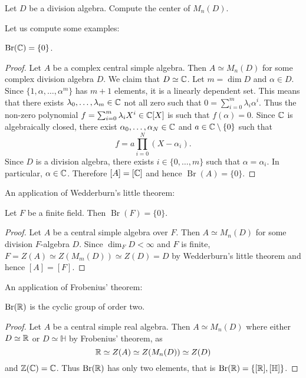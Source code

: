 \begin{exercise}
    Let $D$ be a division algebra. Compute the center of $M_n(D)$. 
\end{exercise}

Let us compute some examples:

\begin{proposition}
    $\operatorname{Br}(\mathbb{C})=\{0\}$.
\end{proposition}

\begin{proof}
    Let $A$ be a complex central simple algebra. Then $A\simeq M_n(D)$ for 
    some complex division algebra $D$. We claim that $D\simeq\mathbb{C}$. Let $m=\dim D$ and $\alpha\in D$. 
    Since $\{1,\alpha,\dots,\alpha^m\}$ has $m+1$ elements, it is a linearly dependent set. This means
    that there exists $\lambda_0,\dots,\lambda_m\in\mathbb{C}$ not all zero such that 
    $0=\sum_{i=0}^m\lambda_i\alpha^i$. Thus the non-zero polynomial $f=\sum_{i=0}^m\lambda_iX^i\in\mathbb{C}[X]$
    is such that $f(\alpha)=0$. Since $\mathbb{C}$ is algebraically closed, 
    there exist $\alpha_0,\dots,\alpha_N\in\mathbb{C}$ and $a\in\mathbb{C}\setminus\{0\}$ such that 
    \[
    f=a\prod_{i=0}^N(X-\alpha_i).
    \]
    Since $D$ is a division algebra, there exists $i\in\{0,\dots,m\}$ such that
    $\alpha=\alpha_i$. In particular, $\alpha\in\mathbb{C}$. Therefore $[A]=[\mathbb{C}]$
    and hence $\operatorname{Br}(A)=\{0\}$. 
\end{proof}

An application of Wedderburn's little theorem:

\begin{proposition}
    Let $F$ be a finite field. Then 
    $\operatorname{Br}(F)=\{0\}$.
\end{proposition}

\begin{proof}
    Let $A$ be a central simple algebra over $F$. Then 
    $A\simeq M_n(D)$ for some division $F$-algebra $D$. Since $\dim_FD<\infty$
    and $F$ is finite, $F=Z(A)\simeq Z(M_m(D))\simeq Z(D)=D$ 
    by Wedderburn's little theorem 
    and hence $[A]=[F]$. 
\end{proof}

An application of Frobenius' theorem:

\begin{proposition}
    $\operatorname{Br}(\mathbb{R})$ is the cyclic group of order two. 
\end{proposition}

\begin{proof}
    Let $A$ be a central simple real algebra. Then $A\simeq M_n(D)$ 
    where either $D\simeq\mathbb{R}$ or $D\simeq\mathbb{H}$ by Frobenius' theorem, as 
    \[
    \mathbb{R}\simeq Z(A)\simeq Z(M_n(D))\simeq Z(D)
    \]
    and $\mathbb{Z}(\mathbb{C})=\mathbb{C}$. Thus $\operatorname{Br}(\mathbb{R})$ has only two elements, that is
    $\operatorname{Br}(\mathbb{R})=\{[\mathbb{R}],[\mathbb{H}]\}$. 
\end{proof}


